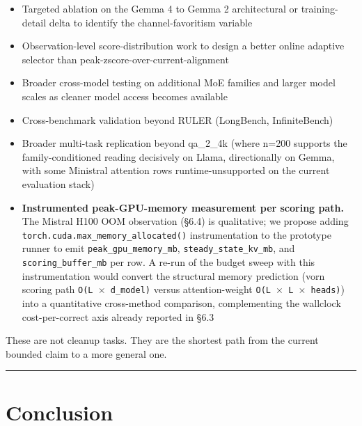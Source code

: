 \documentclass[10pt]{article}
\providecommand{\tightlist}{%
 \setlength{\itemsep}{0pt}\setlength{\parskip}{0pt}}
\begin{document}
\begin{itemize}
\tightlist
\item
 Targeted ablation on the Gemma 4 to Gemma 2 architectural or
 training-detail delta to identify the channel-favoritism variable
\item
 Observation-level score-distribution work to design a better online
 adaptive selector than peak-zscore-over-current-alignment
\item
 Broader cross-model testing on additional MoE families and larger
 model scales as cleaner model access becomes available
\item
 Cross-benchmark validation beyond RULER (LongBench, InfiniteBench)
\item
 Broader multi-task replication beyond qa\_2\_4k (where n=200 supports
 the family-conditioned reading decisively on Llama, directionally on
 Gemma, with some Ministral attention rows runtime-unsupported on the
 current evaluation stack)
\item
 \textbf{Instrumented peak-GPU-memory measurement per scoring path.}
 The Mistral H100 OOM observation (\S{}6.4) is qualitative; we propose
 adding \texttt{torch.\allowbreak{}cuda.\allowbreak{}max\_memory\_allocated()} instrumentation to
 the prototype runner to emit \texttt{peak\_gpu\_memory\_mb},
 \texttt{steady\_state\_kv\_mb}, and \texttt{scoring\_buffer\_mb} per
 row. A re-run of the budget sweep with this instrumentation would
 convert the structural memory prediction (vorn scoring path
 \texttt{O(L\ $\times$\ d\_model)} versus attention-weight
 \texttt{O(L\ $\times$\ L\ $\times$\ heads)}) into a quantitative cross-method
 comparison, complementing the wallclock cost-per-correct axis already
 reported in \S{}6.3
\end{itemize}

These are not cleanup tasks. They are the shortest path from the current
bounded claim to a more general one.

\begin{center}\rule{0.5\linewidth}{0.5pt}\end{center}

\section{Conclusion}\label{7-conclusion}
\end{document}
